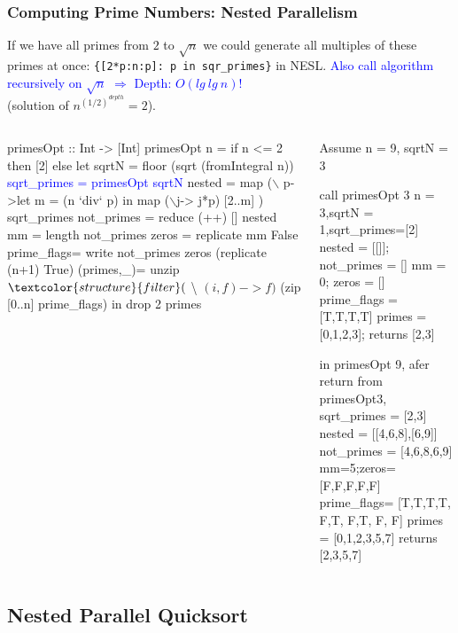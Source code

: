 \documentclass{beamer}
\newcommand{\blue}[1]{\textcolor{Blue}{{#1}}}
\renewcommand{\emph}[1]{\textcolor{structure}{#1}}
\newcommand{\emp}[1]{\textcolor{DikuRed}{ #1}}
\newcommand{\mymath}[1]{$ #1 $}
\begin{document}
\begin{frame}[fragile,t]
  \frametitle{Computing Prime Numbers: Nested Parallelism}
\vspace{-2ex}
If we have all primes from $2$ to $\sqrt{n}$ we could
generate all multiples of these primes at once:
\emp{\tt \{[2*p:n:p]: p in sqr\_primes\}} in NESL.
\blue{Also call algorithm recursively on $\sqrt{n}$ $\Rightarrow$ Depth: $O(lg \ lg \ n)$!}\\
(solution of $n^{(1/2)^{depth}}=2$).
\pause
\begin{columns}
\begin{colorcode}[fontsize=\scriptsize]
primesOpt :: Int -> [Int]
primesOpt n = 
  if n <= 2 then [2]
  else 
   let sqrtN = floor (sqrt (fromIntegral n))
       \blue{sqrt_primes = primesOpt sqrtN}
       nested = \emp{map} (\mymath{\backslash}\emp{p}->let m = (n `div` p) 
                         in  \emp{map} (\mymath{\backslash}j-> j*p)
                                 [2..m]
                    ) \emp{sqrt_primes}
       not_primes  = \emph{reduce} (++) [] nested
       mm = length not_primes
       zeros = \emph{replicate} mm False 
       prime_flags= \emph{write} not_primes zeros 
                    \emph{(replicate} (n+1) True)
       (primes,_)= unzip $ \emph{filter} (\mymath{\backslash}(i,f)->f) 
                    $ (zip [0..n] prime_flags)
   in drop 2 primes
\end{colorcode}
\pause
\begin{colorcode}[fontsize=\scriptsize]
Assume n = 9, sqrtN = 3 

call primesOpt 3
n = 3,sqrtN = 1,sqrt_primes=[2]
nested = [[]]; not\_primes = [] 
mm = 0; zeros = []
prime_flags = [T,T,T,T]
primes = [0,1,2,3]; returns [2,3]

in primesOpt 9, afer 
return from primesOpt3,
sqrt_primes = [2,3]
nested = [[4,6,8],[6,9]]
not_primes = [4,6,8,6,9]
mm=5;zeros= [F,F,F,F,F]
prime_flags= [T,T,T,T,\emp{F},T,\emp{F},T,\emp{F},\emp{F}]
primes = [0,1,2,3,5,7]
returns [2,3,5,7]
\end{colorcode}
\end{columns}

\end{frame}

\subsection{Nested Parallel Quicksort}
\end{document}
